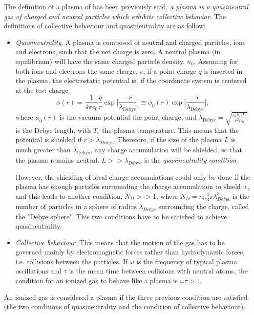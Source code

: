 \documentclass[a4paper,12pt,oneside]{book}
\begin{document}
The definition of a plasma of \cite{Chen} has been previously said, \textit{a plasma is a quasineutral gas of charged and neutral particles which exhibits collective behavior}. The definitions of collective behaviour and quasineutrality are as follow:%
%
\begin{itemize}

\item \textit{Quasineutrality}. A plasma is composed of neutral and charged particles, ions and electrons, such that the net charge is zero. A neutral plasma (in equilibrium) will have the same charged particle density, $n_0$. Assuming for both ions and electrons the same charge, $e$, if a point charge $q$ is inserted in the plasma, the electrostatic potential is, if the coordinate system is centered at the test charge
%
\begin{equation}
\phi(r)=\dfrac{1}{4 \pi \epsilon_0}\dfrac{q}{r} \exp \Big[\frac{-r}{\lambda_{\text{Debye}}} \Big] \equiv \phi_0(r) \exp \Big[\frac{-r}{\lambda_{\text{Debye}}} \Big],
\end{equation}
%
where $\phi_0(r)$ is the vacuum potential the  point charge, and $\lambda_{\text{Debye}}=\sqrt{\frac{\epsilon_0 k_B T_e}{e^2 n_0}}$ is the Debye length, with $T_e$ the plasma temperature. This means that the potential is shielded if $r> \lambda_{Debye}$. Therefore, if the size of the plasma $L$ is much greater than $\lambda_{\text{Debye}}$, any charge accumulation will be shielded, so that the plasma remains neutral. $L>>\lambda_{\text{Debye}}$ is the\textit{ quasineutrality condition}. 

However, the shielding of local charge accumulations could only be done if the plasma has enough particles surrounding the charge accumulation to shield it, and this leads to another condition, $N_D>>1$, where $N_D=n_0 \frac{4}{3} \pi  \lambda_{Debye}^3$ is the number of particles in a sphere of radius $\lambda_{Debye}$ surrounding the charge, called the "Debye sphere". This two conditions have to be satisfied to achieve quasineutrality.

\item \textit{Collective behaviour}. This means that the motion of the gas has to be governed mainly by electromagnetic forces rather than hydrodynamic forces, i.e. collisions between the particles. If $\omega$ is the frequency of typical plasma oscillations and $\tau$ is the mean time between collisions with neutral atoms, the condition for an ionized gas to behave like a plasma is $\omega \tau>1$.

\end{itemize}
%
An ionized gas is considered a plasma if the three previous condition are satisfied (the two conditions of quasineutrality and the condition of collective behaviour).
\end{document}
